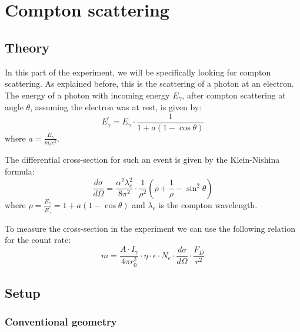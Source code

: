 \documentclass[a4paper,12pt]{article}
\begin{document}
\clearpage
\section{Compton scattering}

\subsection{Theory}
In this part of the experiment, we will be specifically looking for compton scattering. As explained before, this is the scattering of a photon at an electron.
The energy of a photon with incoming energy $E_\gamma$, after compton scattering at angle $\theta$, assuming the electron was at rest, is given by: 
\begin{equation}
	E_\gamma^\prime = E_\gamma \cdot \frac{1}{1+a(1-\cos\theta)} 
\end{equation}
where $a = \frac{E_\gamma}{m_e c^2}$.

The differential cross-section for such an event is given by the Klein-Nishina formula:
\begin{equation}
	\frac{d\sigma}{d\Omega} = \frac{\alpha^2\lambda_e^2}{8\pi^2} \cdot\frac{1}{\rho^2} (\rho+\frac{1}{\rho}-\sin^2\theta)
\end{equation}
where $\rho=\frac{E_\gamma}{E_\gamma^\prime} = 1+a(1-\cos\theta)$ and $\lambda_e$ is the compton wavelength.

To measure the cross-section in the experiment we can use the following relation for the count rate:
\begin{equation}
	m = \frac{A \cdot I_\gamma}{4 \pi r_0^2} \cdot \eta \cdot \epsilon \cdot N_e \cdot \frac{d\sigma}{d\Omega} \cdot \frac{F_D}{r^2}
\end{equation}



\subsection{Setup}

\subsubsection{Conventional geometry}
\end{document}
